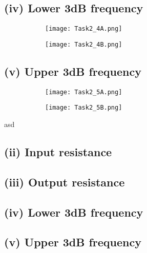 	\subsection*{(iv) Lower 3dB frequency}

	\begin{figure}[h!]
	    \centering
	    \begin{subfigure}[h]{0.5\textwidth}
	            \texttt{[image: Task2\_4A.png]}
	            \label{fig:}
	    \end{subfigure}
	    \begin{subfigure}[h]{0.2\textwidth}
	            \texttt{[image: Task2\_4B.png]}
	            \label{fig:}
	    \end{subfigure}
	\end{figure}
	
	\subsection*{(v) Upper 3dB frequency}

	\begin{figure}[h!]
	    \centering
	    \begin{subfigure}[h]{0.5\textwidth}
	            \texttt{[image: Task2\_5A.png]}
	            \label{fig:}
	    \end{subfigure}
	    \begin{subfigure}[h]{0.2\textwidth}
	            \texttt{[image: Task2\_5B.png]}
	            \label{fig:}
	    \end{subfigure}
	\end{figure}
	asd



  \subsection*{(ii) Input resistance}
  \subsection*{(iii) Output resistance}
  \subsection*{(iv) Lower 3dB frequency}
  \subsection*{(v) Upper 3dB frequency}

